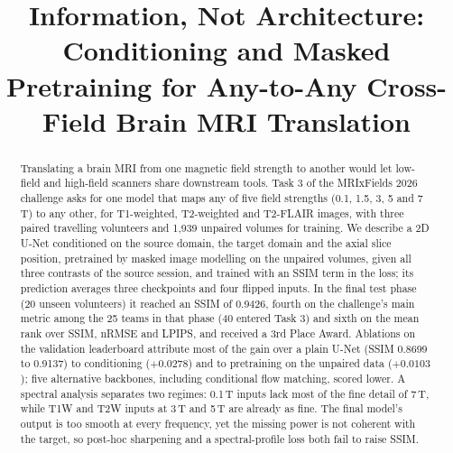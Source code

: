 \documentclass[conference]{IEEEtran}
\begin{document}
\title{Information, Not Architecture: Conditioning and Masked Pretraining for Any-to-Any
Cross-Field Brain MRI Translation}

\author{
}

\maketitle

\begin{abstract}
Translating a brain MRI from one magnetic field strength to another would let low-field and
high-field scanners share downstream tools. Task 3 of the MRIxFields 2026 challenge asks for one
model that maps any of five field strengths (0.1, 1.5, 3, 5 and 7\,T) to any other, for
T1-weighted, T2-weighted and T2-FLAIR images, with three paired travelling volunteers and
1{,}939 unpaired volumes for training. We describe a 2D U-Net conditioned on the source domain,
the target domain and the axial slice position, pretrained by masked image modelling on the
unpaired volumes, given all three contrasts of the source session, and trained with an SSIM term
in the loss; its prediction averages three checkpoints and four flipped inputs. In the final
test phase (20 unseen volunteers) it reached an SSIM of 0.9426, fourth on the challenge's main
metric among the 25 teams in that phase (40 entered Task 3) and sixth on the mean rank over
SSIM, nRMSE and LPIPS, and received a 3rd Place Award. Ablations on the validation leaderboard
attribute most of the gain over a plain U-Net (SSIM 0.8699 to 0.9137) to conditioning
($+0.0278$) and to pretraining on the unpaired data ($+0.0103$); five alternative backbones,
including conditional flow matching, scored lower. A spectral analysis separates two regimes:
0.1\,T inputs lack most of the fine detail of 7\,T, while T1W and T2W inputs at 3\,T and 5\,T
are already as fine. The final model's output is too smooth at every frequency, yet the missing
power is not coherent with the target, so post-hoc sharpening and a spectral-profile loss both
fail to raise SSIM.
\end{abstract}
\end{document}
